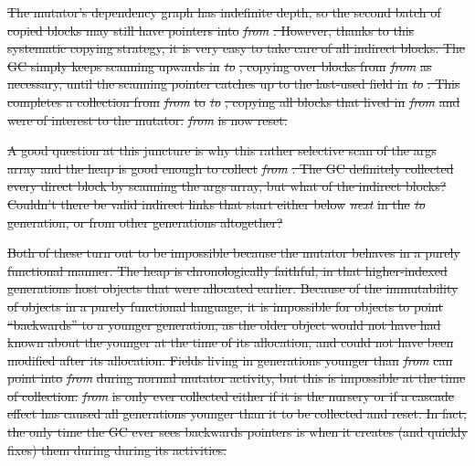 \documentclass[acmsmall,screen]{acmart}  %
\providecommand{\DIFdel}[1]{{\protect\color{red}\sout{#1}}}                      %
\begin{document}
\DIFdel{The mutator's dependency graph has indefinite depth, so the second 
batch of copied blocks may still have pointers into }\emph{\DIFdel{from}}%
\DIFdel{. 
However, thanks to this systematic
copying strategy, it is very easy to take care of all indirect
blocks. The GC simply keeps scanning upwards in 
}\emph{\DIFdel{to}}%
\DIFdel{, copying over blocks from }\emph{\DIFdel{from}} %
\DIFdel{as necessary, 
until the scanning pointer catches up to the last-used field in
}\emph{\DIFdel{to}}%
\DIFdel{. This completes a collection 
from }\emph{\DIFdel{from}} %
\DIFdel{to }\emph{\DIFdel{to}}%
\DIFdel{, copying all blocks that lived
in }\emph{\DIFdel{from}} %
\DIFdel{and were of interest to the mutator. 
}\emph{\DIFdel{from}} %
\DIFdel{is now reset.
}%

\DIFdel{A good question at this juncture is why this rather selective scan 
of the args array and the heap is good enough to collect }\emph{\DIFdel{from}}%
\DIFdel{. 
The GC definitely collected every direct block by scanning the args array,
but what of the indirect blocks? Couldn't there be valid indirect links
that start either below }\emph{\DIFdel{next}} %
\DIFdel{in the }\emph{\DIFdel{to}} %
\DIFdel{generation, 
or from other generations altogether? 
}%

\DIFdel{Both of these turn out to be impossible because the 
mutator behaves in 
a purely functional manner.
The heap is chronologically
faithful, in that higher-indexed generations host
objects that were allocated earlier. Because
of the immutability of objects in a purely functional language, 
it is impossible for objects to point ``backwards'' to 
a younger generation, as the older object would not have
had known about the younger at the time of its allocation, and could not have been modified after its allocation. Fields living in generations 
younger than }\emph{\DIFdel{from}} %
\DIFdel{can point into }\emph{\DIFdel{from}} %
\DIFdel{during 
normal mutator activity, but this is
impossible at the 
time of collection: 
}\emph{\DIFdel{from}} %
\DIFdel{is only ever collected either if it is
the nursery or if a cascade effect has caused all generations younger
than it to be collected and reset. 
In fact, the only time the GC ever sees backwards pointers
is when it creates (and quickly fixes) them during during its 
activities.
}%
\end{document}
